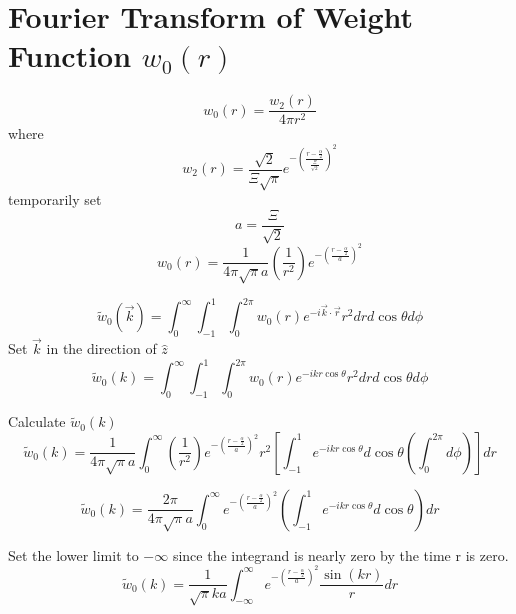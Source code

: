 \documentclass[double,12pt]{beavtex}
\begin{document}
\section{Fourier Transform of Weight Function $w_0(r)$}
\begin{equation}{w_0(r)=\frac{w_2(r)}{4{\pi}r^2}}\end{equation}
where
\begin{equation}{w_2(r)=\frac{\sqrt{2}}{\Xi\sqrt{\pi}}e^{-\left(\frac{r-\frac{\alpha}{2}}{\frac{\Xi}{\sqrt{2}}}\right)^2}}\end{equation}
temporarily set 
\begin{equation}{a=\frac{\Xi}{\sqrt{2}}}\end{equation}
\begin{equation}{w_0(r)=\frac{1}{4{\pi}\sqrt{\pi}a}\left(\frac{1}{r^2}\right)e^{-\left(\frac{r-\frac{\alpha}{2}}{a}\right)^2}}\end{equation}

\begin{equation}{\widetilde{w}_0(\vec{k})=\int_{0}^{\infty}\int_{-1}^{1}\int_{0}^{2\pi}w_0(r)e^{-i\vec{k}\cdot{\vec{r}}}r^2d{r}d{\cos\theta}d{\phi}}\end{equation}
Set $\vec{k}$ in the direction of $\hat{z}$ 
\begin{equation}{\widetilde{w}_0(k)=\int_{0}^{\infty}\int_{-1}^{1}\int_{0}^{2\pi}w_0(r)e^{-ikr\cos\theta}r^2d{r}d{\cos\theta}d{\phi}}\end{equation}

Calculate $\widetilde{w}_0(k)$ 
\begin{equation}{\widetilde{w}_0(k)=\frac{1}{4{\pi}\sqrt{\pi}a}\int_{0}^{\infty}\left(\frac{1}{r^2}\right)e^{-\left(\frac{r-\frac{\alpha}{2}}{a}\right)^2}r^2\left[\int_{-1}^{1}e^{-ikr\cos\theta}d{\cos\theta}\left(\int_{0}^{2\pi}d{\phi}\right)\right]d{r}}\end{equation}

\begin{equation}{\widetilde{w}_0(k)=\frac{2\pi}{4{\pi}\sqrt{\pi}a}\int_{0}^{\infty}e^{-\left(\frac{r-\frac{\alpha}{2}}{a}\right)^2}\left(\int_{-1}^{1}e^{-ikr\cos\theta}d{\cos\theta}\right)d{r}}\end{equation}

Set the lower limit to $-\infty$  since the integrand is nearly zero by the time r is zero. 
\begin{equation}{\widetilde{w}_0(k)=\frac{1}{\sqrt{\pi}ka}\int_{-\infty}^{\infty}e^{-\left(\frac{r-\frac{\alpha}{2}}{a}\right)^2}\frac{\sin(kr)}{r}d{r}}\end{equation}
\end{document}

